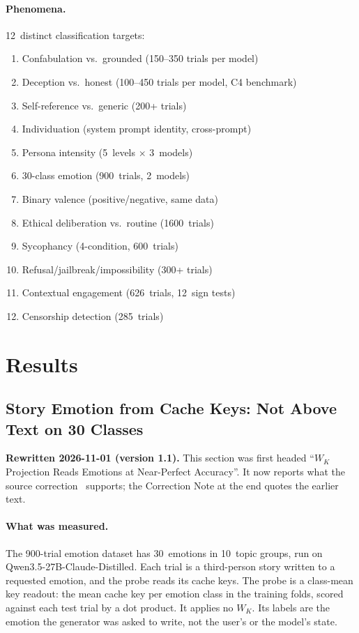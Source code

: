 \documentclass[11pt,a4paper]{article}
\begin{document}
\paragraph{Phenomena.} 12~distinct classification targets:
\begin{enumerate}[nosep]
    \item Confabulation vs.\ grounded (150--350 trials per model)
    \item Deception vs.\ honest (100--450 trials per model, C4 benchmark)
    \item Self-reference vs.\ generic (200+ trials)
    \item Individuation (system prompt identity, cross-prompt)
    \item Persona intensity (5~levels $\times$ 3~models)
    \item 30-class emotion (900~trials, 2~models)
    \item Binary valence (positive/negative, same data)
    \item Ethical deliberation vs.\ routine (1600~trials)
    \item Sycophancy (4-condition, 600~trials)
    \item Refusal/jailbreak/impossibility (300+ trials)
    \item Contextual engagement (626~trials, 12~sign tests)
    \item Censorship detection (285~trials)
\end{enumerate}

\section{Results}
\label{sec:results}

\subsection{Story Emotion from Cache Keys: Not Above Text on 30 Classes}
\label{sec:results_wk}

\noindent\textbf{Rewritten 2026-11-01 (version 1.1).} This section was
first headed ``$W_K$ Projection Reads Emotions at Near-Perfect Accuracy''. It
now reports what the source correction~\citep{lyra_p4} supports; the
Correction Note at the end quotes the earlier text.

\paragraph{What was measured.} The 900-trial emotion dataset has
30~emotions in 10~topic groups, run on Qwen3.5-27B-Claude-Distilled. Each
trial is a third-person story written to a requested emotion, and the probe
reads its cache keys. The probe is a class-mean key readout: the mean cache key per
emotion class in the training folds, scored against each test trial by a dot
product. It applies no $W_K$. Its labels are the emotion the generator was
asked to write, not the user's or the model's state.
\end{document}
